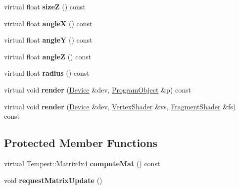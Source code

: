 \begin{DoxyCompactItemize}
\item 
\hypertarget{class_tempest_1_1_graphic_object_acb892c8478a35709d3960d0799234690}{virtual float {\bfseries size\+Z} () const }\label{class_tempest_1_1_graphic_object_acb892c8478a35709d3960d0799234690}

\item 
\hypertarget{class_tempest_1_1_graphic_object_a8693934f5b669c05eeba009f044f122b}{virtual float {\bfseries angle\+X} () const }\label{class_tempest_1_1_graphic_object_a8693934f5b669c05eeba009f044f122b}

\item 
\hypertarget{class_tempest_1_1_graphic_object_a2bcccbc084fc76365a700e8d195e3748}{virtual float {\bfseries angle\+Y} () const }\label{class_tempest_1_1_graphic_object_a2bcccbc084fc76365a700e8d195e3748}

\item 
\hypertarget{class_tempest_1_1_graphic_object_a183d2ac469344f579743ac4a5ef2806f}{virtual float {\bfseries angle\+Z} () const }\label{class_tempest_1_1_graphic_object_a183d2ac469344f579743ac4a5ef2806f}

\item 
\hypertarget{class_tempest_1_1_graphic_object_ab8f72a0102f10a0e862406e5b0bca99e}{virtual float {\bfseries radius} () const }\label{class_tempest_1_1_graphic_object_ab8f72a0102f10a0e862406e5b0bca99e}

\item 
\hypertarget{class_tempest_1_1_graphic_object_a166c681f17eb40155f596d1c92cb27aa}{virtual void {\bfseries render} (\hyperlink{class_tempest_1_1_device}{Device} \&dev, \hyperlink{class_tempest_1_1_program_object}{Program\+Object} \&p) const }\label{class_tempest_1_1_graphic_object_a166c681f17eb40155f596d1c92cb27aa}

\item 
\hypertarget{class_tempest_1_1_graphic_object_aa1daf9c938c6520ca42bcc1332464909}{virtual void {\bfseries render} (\hyperlink{class_tempest_1_1_device}{Device} \&dev, \hyperlink{class_tempest_1_1_vertex_shader}{Vertex\+Shader} \&vs, \hyperlink{class_tempest_1_1_fragment_shader}{Fragment\+Shader} \&fs) const }\label{class_tempest_1_1_graphic_object_aa1daf9c938c6520ca42bcc1332464909}

\end{DoxyCompactItemize}
\subsection*{Protected Member Functions}
\begin{DoxyCompactItemize}
\item 
\hypertarget{class_tempest_1_1_graphic_object_aad5a56638462c930c98ff7df72bce82f}{virtual \hyperlink{class_tempest_1_1_matrix4x4}{Tempest\+::\+Matrix4x4} {\bfseries compute\+Mat} () const }\label{class_tempest_1_1_graphic_object_aad5a56638462c930c98ff7df72bce82f}

\item 
\hypertarget{class_tempest_1_1_graphic_object_ae686b02ae09d62eb9d50585355ecc748}{void {\bfseries request\+Matrix\+Update} ()}\label{class_tempest_1_1_graphic_object_ae686b02ae09d62eb9d50585355ecc748}

\end{DoxyCompactItemize}
